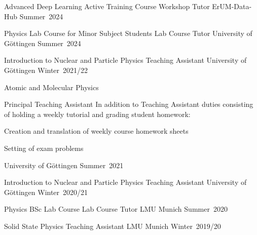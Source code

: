 


\begin{cvhonorsleft}[4.5cm]

  \cvhonor
    {Advanced Deep Learning Active Training Course} %
    {Workshop Tutor} %
    {ErUM-Data-Hub} %
    {Summer~2024} %

  \cvhonor
    {Physics Lab Course for Minor Subject Students} %
    {Lab Course Tutor} %
    {University of G\"ottingen} %
    {Summer~2024} %

  \cvhonor
    {Introduction to Nuclear and Particle Physics} %
    {Teaching Assistant} %
    {University of G\"ottingen} %
    {Winter~2021/22} %

  \cvhonor
    {Atomic and Molecular Physics} %
    {%
      Principal Teaching Assistant\newline
      In addition to Teaching Assistant duties consisting of holding a weekly tutorial and grading student homework:\newline~
      \begin{cvitems}
        \item {Creation and translation of weekly course homework sheets}
        \item {Setting of exam problems}
      \end{cvitems}
    } %
    {University of G\"ottingen} %
    {Summer~2021} %

  \cvhonor
    {Introduction to Nuclear and Particle Physics} %
    {Teaching Assistant} %
    {University of G\"ottingen} %
    {Winter~2020/21} %

  \cvhonor
    {Physics BSc Lab Course} %
    {Lab Course Tutor} %
    {LMU Munich} %
    {Summer~2020} %

  \cvhonor
    {Solid State Physics} %
    {Teaching Assistant} %
    {LMU Munich} %
    {Winter~2019/20} %

\end{cvhonorsleft}
